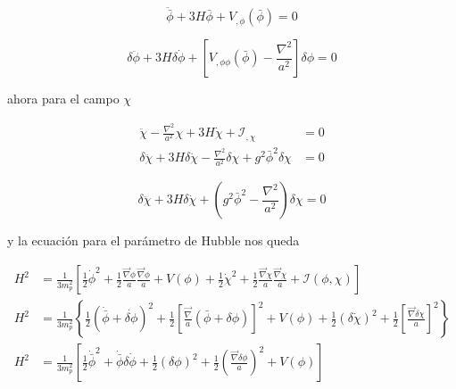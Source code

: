 \begin{equation}
    \ddot{\bar{\phi}} + 3 H \bar{\phi} + V_{,\phi} (\bar{\phi}) = 0
\end{equation}

\begin{equation}
    \delta \ddot{\phi} + 3 H \delta \dot{\phi} + \left[  V_{,\phi\phi} (\bar{\phi}) - \frac{\nabla^2}{a^2} \right] \delta \phi = 0
\end{equation}

\noindent
ahora para el campo $\chi$

\begin{equation*}
    \begin{split}
        \ddot{\chi} - \frac{\nabla^2}{a^2} \chi + 3 H \dot{\chi} + \mathcal{I}_{,\chi} &= 0\\
        \delta \ddot{\chi} + 3 H \delta \dot\chi - \frac{\nabla^2}{a^2} \delta \chi + g^2 \bar{\phi}^2 \delta \chi &= 0
    \end{split}
\end{equation*}

\begin{equation}
    \delta \ddot{\chi} + 3 H \delta \dot{\chi} + \left( g^2 \bar{\phi}^2 - \frac{\nabla^2}{a^2} \right) \delta \chi = 0
\end{equation}

\noindent
y la ecuación para el parámetro de Hubble nos queda

\begin{equation*}
    \begin{split}
        H^2 &= \frac{1}{3 m_p^2} \left[ \frac{1}{2} \dot{\phi}^2 + \frac{1}{2} \frac{\vec{\nabla} \phi}{a} \frac{\vec{\nabla} \phi}{a} + V(\phi) + \frac{1}{2} \dot{\chi}^2 + \frac{1}{2} \frac{\vec{\nabla} \chi}{a} \frac{\vec{\nabla} \chi}{a} + \mathcal{I} (\phi, \chi) \right]\\
        H^2 &= \frac{1}{3 m_p^2} \left\{ \frac{1}{2} \left( \dot{\bar{\phi}} + \dot{\delta \phi} \right)^2 + \frac{1}{2} \left[ \frac{\vec{\nabla}}{a} \left( \bar{\phi} + \delta \phi \right) \right]^2 + V(\phi) + \frac{1}{2} (\delta \dot{\chi})^2 + \frac{1}{2} \left[ \frac{\vec{\nabla} \delta \chi}{a} \right]^2 \right\}\\
        H^2 &= \frac{1}{3 m_p^2} \left[ \frac{1}{2} \dot{\bar{\phi}}^2 + \dot{\bar{\phi}} \delta \dot{\phi} + \frac{1}{2} (\delta \phi)^2 + \frac{1}{2} \left( \frac{\vec{\nabla} \delta \phi}{a} \right)^2 + V(\phi) \right]
    \end{split}
\end{equation*}

